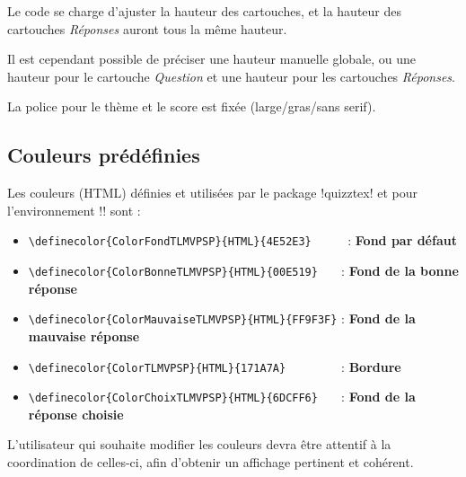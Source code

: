 \documentclass[french,a4paper,11pt]{article}
\begin{document}
\begin{importantblock}
Le code se charge d'ajuster la hauteur des cartouches, et la hauteur des cartouches \textit{Réponses} auront tous la même hauteur.

\smallskip

Il est cependant possible de préciser une hauteur manuelle globale, ou une hauteur pour le cartouche \textit{Question} et une hauteur pour les cartouches \textit{Réponses}.

\smallskip

La police pour le thème et le score est fixée (large/gras/sans serif).
\end{importantblock}

\subsection{Couleurs prédéfinies}

\begin{tipblock}
Les couleurs (HTML) définies et utilisées par le package \packagetex!quizztex! et pour l'environnement \motcletex!\QuizzMillions! sont :

\begin{itemize}[leftmargin=*]
	\item \verb!\definecolor{ColorFondTLMVPSP}{HTML}{4E52E3}     ! : \textcolor{ColorFondTLMVPSP}{\textsf{\textbf{Fond par défaut}}}
	\item \verb!\definecolor{ColorBonneTLMVPSP}{HTML}{00E519}   ! : \textcolor{ColorBonneTLMVPSP}{\textsf{\textbf{Fond de la bonne réponse}}}
	\item \verb!\definecolor{ColorMauvaiseTLMVPSP}{HTML}{FF9F3F}! : \textcolor{ColorMauvaiseTLMVPSP}{\textsf{\textbf{Fond de la mauvaise réponse}}}
	\item \verb!\definecolor{ColorTLMVPSP}{HTML}{171A7A}        ! : \textcolor{ColorTLMVPSP}{\textsf{\textbf{Bordure}}}
	\item \verb!\definecolor{ColorChoixTLMVPSP}{HTML}{6DCFF6}   ! : \textcolor{ColorChoixTLMVPSP}{\textsf{\textbf{Fond de la réponse choisie}}}
\end{itemize}

L'utilisateur qui souhaite modifier les couleurs devra être attentif à la coordination de celles-ci, afin d'obtenir un affichage pertinent et cohérent.
\end{tipblock}

\begin{DemoCode}[]
\QuizzPrendrePlace{\lipsum[1][1-2]}
{\lipsum[2][1]}{\lipsum[2][2]}{\lipsum[2][3]}{\lipsum[2][5]}
\end{DemoCode}
\end{document}
